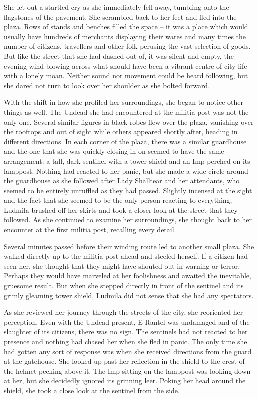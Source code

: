  

She let out a startled cry as she immediately fell away, tumbling onto the flagstones of the pavement. She scrambled back to her feet and fled into the plaza. Rows of stands and benches filled the space – it was a place which would usually have hundreds of merchants displaying their wares and many times the number of citizens, travellers and other folk perusing the vast selection of goods. But like the street that she had dashed out of, it was silent and empty, the evening wind blowing across what should have been a vibrant centre of city life with a lonely moan. Neither sound nor movement could be heard following, but she dared not turn to look over her shoulder as she bolted forward.

 

With the shift in how she profiled her surroundings, she began to notice other things as well. The Undead she had encountered at the militia post was not the only one. Several similar figures in black robes flew over the plaza, vanishing over the rooftops and out of sight while others appeared shortly after, heading in different directions. In each corner of the plaza, there was a similar guardhouse and the one that she was quickly closing in on seemed to have the same arrangement: a tall, dark sentinel with a tower shield and an Imp perched on its lamppost. Nothing had reacted to her panic, but she made a wide circle around the guardhouse as she followed after Lady Shalltear and her attendants, who seemed to be entirely unruffled as they had passed. Slightly incensed at the sight and the fact that she seemed to be the only person reacting to everything, Ludmila brushed off her skirts and took a closer look at the street that they followed. As she continued to examine her surroundings, she thought back to her encounter at the first militia post, recalling every detail.

 

Several minutes passed before their winding route led to another small plaza. She walked directly up to the militia post ahead and steeled herself. If a citizen had seen her, she thought that they might have shouted out in warning or terror. Perhaps they would have marveled at her foolishness and awaited the inevitable, gruesome result. But when she stepped directly in front of the sentinel and its grimly gleaming tower shield, Ludmila did not sense that she had any spectators.

 

As she reviewed her journey through the streets of the city, she reoriented her perception. Even with the Undead present, E-Rantel was undamaged and of the slaughter of its citizens, there was no sign. The sentinels had not reacted to her presence and nothing had chased her when she fled in panic. The only time she had gotten any sort of response was when she received directions from the guard at the gatehouse. She looked up past her reflection in the shield to the crest of the helmet peeking above it. The Imp sitting on the lamppost was looking down at her, but she decidedly ignored its grinning leer. Poking her head around the shield, she took a close look at the sentinel from the side.

